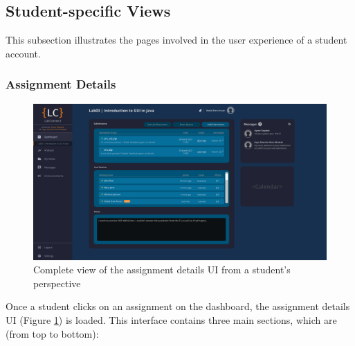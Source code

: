 \documentclass[a4paper, 12pt]{article}
\begin{document}
    
    \pagebreak
    
    
    \subsection{Student-specific Views}
    
    This subsection illustrates the pages involved in the user experience of a student account.
    
    \subsubsection{Assignment Details}
    
    \begin{figure}[H]
        \centering
        \includegraphics[width=\textwidth]{student_assignment_details}
        \caption{Complete view of the assignment details UI from a student's perspective}
        \label{fig:student_assignment_details_full}
    \end{figure}

    Once a student clicks on an assignment on the dashboard, the assignment details UI (Figure \ref{fig:student_assignment_details_full})
    is loaded. This interface contains three main sections, which are (from top to bottom):
\end{document}
